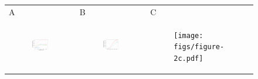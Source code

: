 \documentclass[11pt]{article}
\begin{document}
\begin{figure}[ht]
	\begin{tabular}{lll}
	A&B&C\\
	\begin{subfigure}[t]{0.3\linewidth}
		\centering
		\includegraphics[width=1\linewidth]{figs/figure-2a.pdf} 
	\end{subfigure}&
	\begin{subfigure}[t]{0.3\linewidth}
		\centering
		\includegraphics[width=1\linewidth]{figs/figure-2b.pdf}
	\end{subfigure}&
	\begin{subfigure}[t]{0.3\linewidth}
		\centering
		\texttt{[image: figs/figure-2c.pdf]}
	\end{subfigure}\\
	\end{tabular}

\end{figure}
\end{document}
